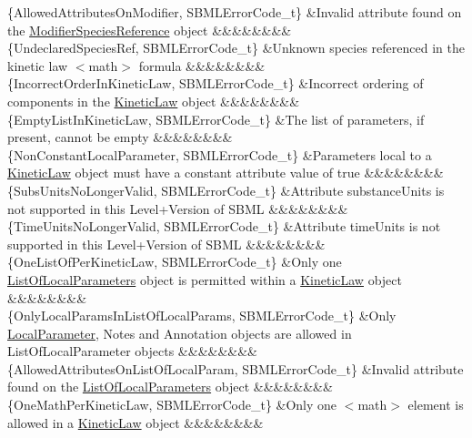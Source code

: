 \begin{DoxyParagraph}{}
\begin{longtabu}
\{Allowed\+Attributes\+On\+Modifier, S\+B\+M\+L\+Error\+Code\+\_\+t\} &Invalid attribute found on the \hyperlink{class_modifier_species_reference}{Modifier\+Species\+Reference} object &&&&&&&&\\
\{Undeclared\+Species\+Ref, S\+B\+M\+L\+Error\+Code\+\_\+t\} &Unknown species referenced in the kinetic law {\ttfamily $<$math$>$} formula &&&&&&&&\\
\{Incorrect\+Order\+In\+Kinetic\+Law, S\+B\+M\+L\+Error\+Code\+\_\+t\} &Incorrect ordering of components in the \hyperlink{class_kinetic_law}{Kinetic\+Law} object &&&&&&&&\\
\{Empty\+List\+In\+Kinetic\+Law, S\+B\+M\+L\+Error\+Code\+\_\+t\} &The list of parameters, if present, cannot be empty &&&&&&&&\\
\{Non\+Constant\+Local\+Parameter, S\+B\+M\+L\+Error\+Code\+\_\+t\} &Parameters local to a \hyperlink{class_kinetic_law}{Kinetic\+Law} object must have a \textquotesingle{}constant\textquotesingle{} attribute value of \textquotesingle{}true\textquotesingle{} &&&&&&&&\\
\{Subs\+Units\+No\+Longer\+Valid, S\+B\+M\+L\+Error\+Code\+\_\+t\} &Attribute \textquotesingle{}substance\+Units\textquotesingle{} is not supported in this Level+\+Version of S\+B\+ML &&&&&&&&\\
\{Time\+Units\+No\+Longer\+Valid, S\+B\+M\+L\+Error\+Code\+\_\+t\} &Attribute \textquotesingle{}time\+Units\textquotesingle{} is not supported in this Level+\+Version of S\+B\+ML &&&&&&&&\\
\{One\+List\+Of\+Per\+Kinetic\+Law, S\+B\+M\+L\+Error\+Code\+\_\+t\} &Only one \hyperlink{class_list_of_local_parameters}{List\+Of\+Local\+Parameters} object is permitted within a \hyperlink{class_kinetic_law}{Kinetic\+Law} object &&&&&&&&\\
\{Only\+Local\+Params\+In\+List\+Of\+Local\+Params, S\+B\+M\+L\+Error\+Code\+\_\+t\} &Only \hyperlink{class_local_parameter}{Local\+Parameter}, Notes and Annotation objects are allowed in List\+Of\+Local\+Parameter objects &&&&&&&&\\
\{Allowed\+Attributes\+On\+List\+Of\+Local\+Param, S\+B\+M\+L\+Error\+Code\+\_\+t\} &Invalid attribute found on the \hyperlink{class_list_of_local_parameters}{List\+Of\+Local\+Parameters} object &&&&&&&&\\
\{One\+Math\+Per\+Kinetic\+Law, S\+B\+M\+L\+Error\+Code\+\_\+t\} &Only one {\ttfamily $<$math$>$} element is allowed in a \hyperlink{class_kinetic_law}{Kinetic\+Law} object &&&&&&&&\\

\end{longtabu}
\end{DoxyParagraph}
